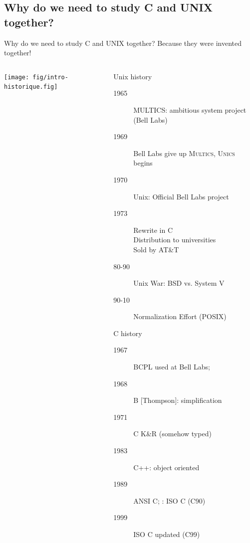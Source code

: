 \subsection{Why do we need to study C and UNIX together?}
\begin{frame}[squeeze]{Why do we need to study C and UNIX together?}
  \alert{\large Because they were invented together!}
  \vspace{-1.5\baselineskip}

    \begin{columns}
    \begin{column}{.55\linewidth}
      \texttt{[image: fig/intro-historique.fig]}      
    \end{column}
    \begin{column}{.45\linewidth}
      \begin{block}{Unix history}        
        \begin{description}
        \item[1965] MULTICS: ambitious system project {\small(Bell Labs)}
        \item[1969] Bell Labs give up  \textsc{Multics}, 
          \textsc{Unics} begins 
        \item[1970] Unix: Official  Bell Labs project
        \item[1973] Rewrite in C\\
          Distribution to universities\\
          Sold by AT\&T
        \item[80-90] Unix War: {\small BSD vs. System V}\\
        \item[90-10] Normalization Effort (POSIX)
        \end{description}
      \end{block}\vspace{-\baselineskip}

      \begin{block}{C history}
        \begin{description}
        \item[1967] BCPL used at Bell Labs; 
        \item[1968] B [Thompson]: simplification
        \item[1971] C K\&R (somehow typed)
        \item[1983] C++: object oriented
        \item[1989] ANSI C; : ISO C {\small(C90)}
        \item[1999] ISO C updated {\small(C99)}
        \end{description}
      \end{block}
    \end{column}
  \end{columns}
\end{frame}

